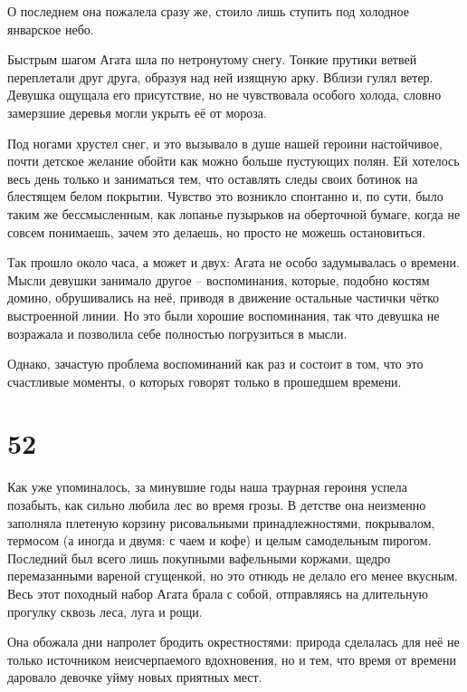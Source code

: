 \documentclass[
  a5paperpaper,
  DIV=11,
  numbers=noendperiod]{scrreprt}
\begin{document}
О последнем она пожалела сразу же, стоило лишь ступить под холодное
январское небо.

Быстрым шагом Агата шла по нетронутому снегу. Тонкие прутики ветвей
переплетали друг друга, образуя над ней изящную арку. Вблизи гулял
ветер. Девушка ощущала его присутствие, но не чувствовала особого
холода, словно замерзшие деревья могли укрыть её от мороза.

Под ногами хрустел снег, и это вызывало в душе нашей героини
настойчивое, почти детское желание обойти как можно больше пустующих
полян. Ей хотелось весь день только и заниматься тем, что оставлять
следы своих ботинок на блестящем белом покрытии. Чувство это возникло
спонтанно и, по сути, было таким же бессмысленным, как лопанье пузырьков
на оберточной бумаге, когда не совсем понимаешь, зачем это делаешь, но
просто не можешь остановиться.

Так прошло около часа, а может и двух: Агата не особо задумывалась о
времени. Мысли девушки занимало другое -- воспоминания, которые, подобно
костям домино, обрушивались на неё, приводя в движение остальные
частички чётко выстроенной линии. Но это были хорошие воспоминания, так
что девушка не возражала и позволила себе полностью погрузиться в мысли.

Однако, зачастую проблема воспоминаний как раз и состоит в том, что это
счастливые моменты, о которых говорят только в прошедшем времени.

\section*{52}\label{52}


Как уже упоминалось, за минувшие годы наша траурная героиня успела
позабыть, как сильно любила лес во время грозы. В детстве она неизменно
заполняла плетеную корзину рисовальными принадлежностями, покрывалом,
термосом (а иногда и двумя: с чаем и кофе) и целым самодельным пирогом.
Последний был всего лишь покупными вафельными коржами, щедро
перемазанными вареной сгущенкой, но это отнюдь не делало его менее
вкусным. Весь этот походный набор Агата брала с собой, отправляясь на
длительную прогулку сквозь леса, луга и рощи.

Она обожала дни напролет бродить окрестностями: природа сделалась для
неё не только источником неисчерпаемого вдохновения, но и тем, что время
от времени даровало девочке уйму новых приятных мест.
\end{document}
